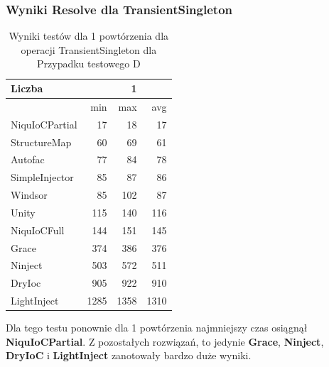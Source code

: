 \documentclass[12pt]{article}
\begin{document}
\subsubsection{Wyniki Resolve dla TransientSingleton}
\begin{table}[H]
\captionsetup{belowskip=0pt,aboveskip=0pt}
\begin{center}
\begin{small}
	\begin{tabular}{ | l | r r r | }
    		\hline
Liczba & & 1 & \\ \hline
 & min & max & avg \\ \hline
NiquIoCPartial & 17 & 18 & 17 \\ \hline
StructureMap & 60 & 69 & 61 \\ \hline
Autofac & 77 & 84 & 78 \\ \hline
SimpleInjector & 85 & 87 & 86 \\ \hline
Windsor & 85 & 102 & 87 \\ \hline
Unity & 115 & 140 & 116 \\ \hline
NiquIoCFull & 144 & 151 & 145 \\ \hline
Grace & 374 & 386 & 376 \\ \hline
Ninject & 503 & 572 & 511 \\ \hline
DryIoc & 905 & 922 & 910 \\ \hline
LightInject & 1285 & 1358 & 1310 \\ \hline
  	\end{tabular}
\end{small}
\end{center}
\caption{Wyniki testów dla 1 powtórzenia dla operacji TransientSingleton dla Przypadku testowego D}
\label{TestCaseD_TransientSingleton}
\end{table}
Dla tego testu ponownie dla 1 powtórzenia najmniejszy czas osiągnął \textbf{NiquIoCPartial}. Z pozostałych rozwiązań, to jedynie \textbf{Grace}, \textbf{Ninject}, \textbf{DryIoC} i \textbf{LightInject} zanotowały bardzo duże wyniki.
\\ \\
\end{document}
